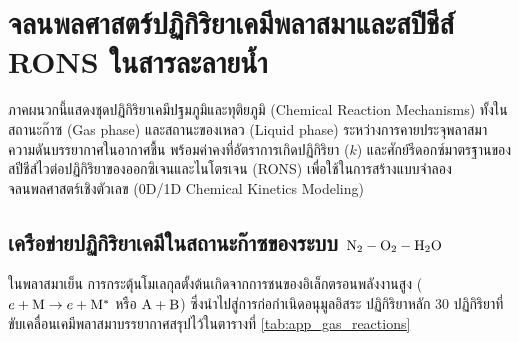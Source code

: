
\chapter{จลนพลศาสตร์ปฏิกิริยาเคมีพลาสมาและสปีชีส์ RONS ในสารละลายน้ำ}
\label{app:chemical_kinetics}

ภาคผนวกนี้แสดงชุดปฏิกิริยาเคมีปฐมภูมิและทุติยภูมิ (Chemical Reaction Mechanisms) ทั้งในสถานะก๊าซ (Gas phase) และสถานะของเหลว (Liquid phase) ระหว่างการคายประจุพลาสมาความดันบรรยากาศในอากาศชื้น พร้อมค่าคงที่อัตราการเกิดปฏิกิริยา ($k$) และศักย์รีดอกซ์มาตรฐานของสปีชีส์ไวต่อปฏิกิริยาของออกซิเจนและไนโตรเจน (RONS) เพื่อใช้ในการสร้างแบบจำลองจลนพลศาสตร์เชิงตัวเลข (0D/1D Chemical Kinetics Modeling)

\section{เครือข่ายปฏิกิริยาเคมีในสถานะก๊าซของระบบ $\ce{N2}-\ce{O2}-\ce{H2O}$}
\label{app:sec_gas_kinetics}

ในพลาสมาเย็น การกระตุ้นโมเลกุลตั้งต้นเกิดจากการชนของอิเล็กตรอนพลังงานสูง ($e + \ce{M} \to e + \ce{M}^*$ หรือ $\ce{A} + \ce{B}$) ซึ่งนำไปสู่การก่อกำเนิดอนุมูลอิสระ ปฏิกิริยาหลัก 30 ปฏิกิริยาที่ขับเคลื่อนเคมีพลาสมาบรรยากาศสรุปไว้ในตารางที่ \ref{tab:app_gas_reactions}

